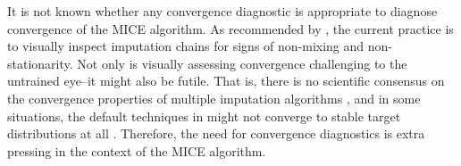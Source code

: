 \documentclass[article]{jss}
\begin{document}

It is not known whether any convergence diagnostic is appropriate to diagnose convergence of the MICE algorithm. As recommended by \cite[\S~6.5.2]{buur18}, the current practice is to visually inspect imputation chains for signs of non-mixing and non-stationarity. Not only is visually assessing convergence challenging to the untrained eye--it might also be futile. That is, there is no scientific consensus on the convergence properties of multiple imputation algorithms \citep{taka17}, and in some situations, the default techniques in  might not converge to stable target distributions at all \citep{murr18}. %
Therefore, the need for convergence diagnostics is extra pressing in the context of the MICE algorithm.
\end{document}
